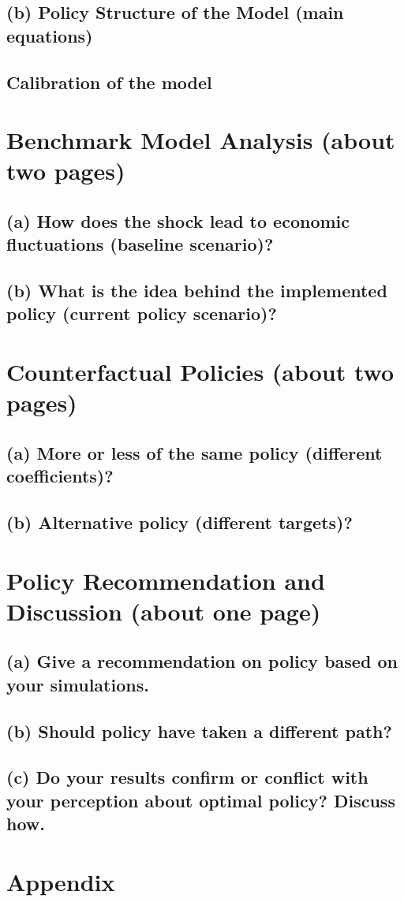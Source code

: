 \documentclass[12pt]{article}
\begin{document}
\subsection{(b) Policy Structure of the Model (main equations)} 
\subsection{Calibration of the model} 

\section{Benchmark Model Analysis (about two pages)}
\subsection{(a) How does the shock lead to economic fluctuations (baseline scenario)? }
\subsection{(b) What is the idea behind the implemented policy (current policy scenario)? }

\section{Counterfactual Policies (about two pages)}
\subsection{(a) More or less of the same policy (different coefficients)? }
\subsection{(b) Alternative policy (different targets)? }

\section{Policy Recommendation and Discussion (about one page)}
\subsection{(a) Give a recommendation on policy based on your simulations. }
\subsection{(b) Should policy have taken a different path? }
\subsection{(c) Do your results confirm or conflict with your perception about optimal policy? Discuss how. }




\section{Appendix}
\end{document}

